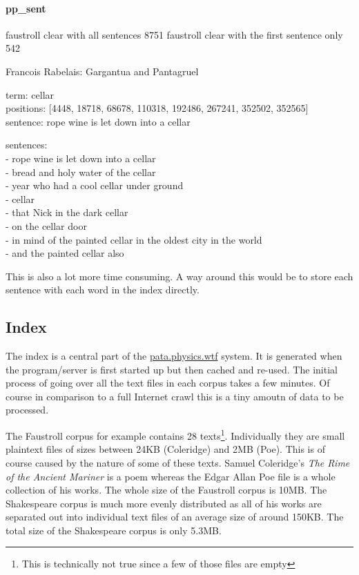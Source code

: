 \paragraph{pp\_sent}

faustroll clear with all sentences 8751 
faustroll clear with the first sentence only 542

Francois Rabelais: Gargantua and Pantagruel

term: cellar\\
positions: [4448, 18718, 68678, 110318, 192486, 267241, 352502, 352565]\\
sentence: rope wine is let down into a cellar

sentences: \\
  - rope wine is let down into a cellar\\
  - bread and holy water of the cellar\\
  - year who had a cool cellar under ground\\
  - cellar\\
  - that Nick in the dark cellar\\
  - on the cellar door\\
  - in mind of the painted cellar in the oldest city in the world\\
  - and the painted cellar also

\begin{draft}
  This is also a lot more time consuming.
  A way around this would be to store each sentence with each word in the index directly.
\end{draft}



\subsection{Index}
\label{s:index}

The index is a central part of the \url{pata.physics.wtf} system. It is generated when the program/server is first started up but then cached and re-used. The initial process of going over all the text files in each corpus takes a few minutes. Of course in comparison to a full Internet crawl this is a tiny amoutn of data to be processed. 

The Faustroll corpus for example contains 28 texts\footnote{This is technically not true since a few of those files are empty}. Individually they are small plaintext files of sizes between 24KB (Coleridge) and 2MB (Poe). This is of course caused by the nature of some of these texts. Samuel Coleridge's \textit{The Rime of the Ancient Mariner} is a poem whereas the Edgar Allan Poe file is a whole collection of his works. The whole size of the Faustroll corpus is 10MB. The Shakespeare corpus is much more evenly distributed as all of his works are separated out into individual text files of an average size of around 150KB. The total size of the Shakespeare corpus is only 5.3MB.

